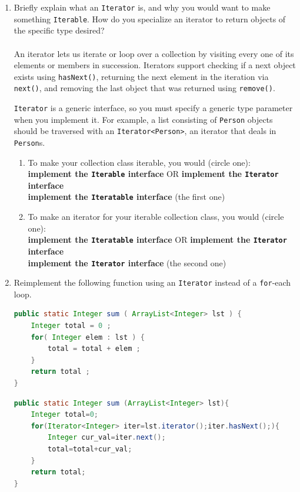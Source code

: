 \documentclass[11pt]{article}
\newenvironment{answer}{\large\lstset{basicstyle=\tiny\ttfamily}\color{white} }{}
\newenvironment{answer}{\large\lstset{basicstyle=\large\ttfamily}\color{red} }{}
\begin{document}
\begin{enumerate}
\newpage
\item Briefly explain what an \texttt{Iterator} is, and why you would want
to make something \texttt{Iterable}. How do you specialize an iterator to return objects of the specific type desired? \\ \\
\begin{answer}
An iterator lets us iterate or loop over a collection by visiting every one of its elements or members in succession.
Iterators support checking if a next object exists using \texttt{hasNext()}, returning the next element in the iteration via \texttt{next()}, and removing the last object that was returned using \texttt{remove()}.

\texttt{Iterator} is a generic interface, so you must specify a generic type parameter when you implement it.
For example, a list consisting of \texttt{Person} objects should be traversed with an \texttt{Iterator<Person>}, an iterator that deals in \texttt{Person}s.
\end{answer}
\begin{enumerate}
	\item To make your collection class iterable, you would (circle one):\\
	\textbf{implement the \texttt{Iterable} interface} OR \textbf{implement the \texttt{Iterator} interface}\\
	\begin{answer}
		\textbf{implement the \texttt{Iteratable} interface} (the first one)
	\end{answer}
	\item To make an iterator for your iterable collection class, you would (circle one):\\
	\textbf{implement the \texttt{Iteratable} interface} OR \textbf{implement the \texttt{Iterator} interface}\\
	\begin{answer}
	\textbf{implement the \texttt{Iterator} interface} (the second one)
	\end{answer}
\end{enumerate}


\vspace{24pt}
\item Reimplement the following function using an \texttt{Iterator} instead of a \texttt{for}-each loop.
\begin{lstlisting}[language=java]
public static Integer sum ( ArrayList<Integer> lst ) {
	Integer total = 0 ;
	for( Integer elem : lst ) {
		total = total + elem ;
	}
	return total ;
}
\end{lstlisting}
\begin{answer}
\begin{lstlisting}[language=java]
public static Integer sum (ArrayList<Integer> lst){
	Integer total=0;
	for(Iterator<Integer> iter=lst.iterator();iter.hasNext();){
		Integer cur_val=iter.next(); 
		total=total+cur_val;
	}
	return total;
}
\end{lstlisting}
\end{answer}



\end{enumerate}
\end{document}
